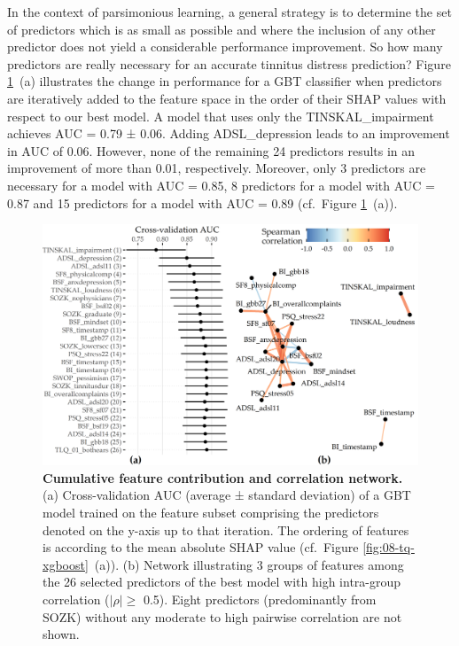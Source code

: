 \documentclass[
  oneside]{book}
\begin{document}
In the context of parsimonious learning, a general strategy is to determine the set of predictors which is as small as possible and where the inclusion of any other predictor does not yield a considerable performance improvement.
So how many predictors are really necessary for an accurate tinnitus distress prediction?
Figure \ref{fig:08-tq-xgboost-parsimonious}~(a) illustrates the change in performance for a GBT classifier when predictors are iteratively added to the feature space in the order of their SHAP values with respect to our best model.
A model that uses only the TINSKAL\_impairment achieves AUC = 0.79 ± 0.06.
Adding ADSL\_depression leads to an improvement in AUC of 0.06.
However, none of the remaining 24 predictors results in an improvement of more than 0.01, respectively.
Moreover, only 3 predictors are necessary for a model with AUC = 0.85, 8 predictors for a model with AUC = 0.87 and 15 predictors for a model with AUC = 0.89 (cf.~Figure \ref{fig:08-tq-xgboost-parsimonious}~(a)).



\begin{figure}[htb]

{\centering \includegraphics[width=1\linewidth]{figures/08-tq-xgboost-parsimonious} 

}

\caption{\textbf{Cumulative feature contribution and correlation network.} (a) Cross-validation AUC (average ± standard deviation) of a GBT model trained on the feature subset comprising the predictors denoted on the y-axis up to that iteration. The ordering of features is according to the mean absolute SHAP value (cf.~Figure \ref{fig:08-tq-xgboost}~(a)). (b) Network illustrating 3 groups of features among the 26 selected predictors of the best model with high intra-group correlation (\(|\rho| \geq\) 0.5). Eight predictors (predominantly from SOZK) without any moderate to high pairwise correlation are not shown.}\label{fig:08-tq-xgboost-parsimonious}
\end{figure}
\end{document}
